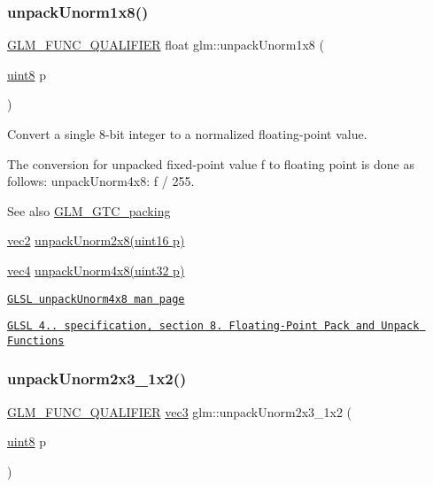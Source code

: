 \subsubsection{\texorpdfstring{unpack\+Unorm1x8()}{unpackUnorm1x8()}}
{\footnotesize\ttfamily \hyperlink{setup_8hpp_a33fdea6f91c5f834105f7415e2a64407}{G\+L\+M\+\_\+\+F\+U\+N\+C\+\_\+\+Q\+U\+A\+L\+I\+F\+I\+ER} float glm\+::unpack\+Unorm1x8 (\begin{DoxyParamCaption}\item[{\hyperlink{group__gtc__type__precision_ga1a7dcd8aac97cc8020817c94049deff2}{uint8}}]{p }\end{DoxyParamCaption})}

Convert a single 8-\/bit integer to a normalized floating-\/point value.

The conversion for unpacked fixed-\/point value f to floating point is done as follows\+: unpack\+Unorm4x8\+: f / 255.

\begin{DoxySeeAlso}{See also}
\hyperlink{group__gtc__packing}{G\+L\+M\+\_\+\+G\+T\+C\+\_\+packing} 

\hyperlink{group__core__types_gaa1618f51db67eaa145db101d8c8431d8}{vec2} \hyperlink{group__gtc__packing_ga96ce0c24339ee676e28a027fffd1edf6}{unpack\+Unorm2x8(uint16 p)} 

\hyperlink{group__core__types_ga5881b1b022d7fd1b7218f5916532dd02}{vec4} \hyperlink{group__core__func__packing_ga7f903259150b67e9466f5f8edffcd197}{unpack\+Unorm4x8(uint32 p)} 

\href{http://www.opengl.org/sdk/docs/manglsl/xhtml/unpackUnorm4x8.xml}{\tt G\+L\+SL unpack\+Unorm4x8 man page} 

\href{http://www.opengl.org/registry/doc/GLSLangSpec.4.20.8.pdf}{\tt G\+L\+SL 4.. specification, section 8. Floating-\/\+Point Pack and Unpack Functions} 
\end{DoxySeeAlso}
\mbox{\label{group__gtc__packing_gaeeacc5275329100c50fe8fc0871eb423}} 
\subsubsection{\texorpdfstring{unpack\+Unorm2x3\+\_\+1x2()}{unpackUnorm2x3\_1x2()}}
{\footnotesize\ttfamily \hyperlink{setup_8hpp_a33fdea6f91c5f834105f7415e2a64407}{G\+L\+M\+\_\+\+F\+U\+N\+C\+\_\+\+Q\+U\+A\+L\+I\+F\+I\+ER} \hyperlink{group__core__types_ga1c47e8b3386109bc992b6c48e91b0be7}{vec3} glm\+::unpack\+Unorm2x3\+\_\+1x2 (\begin{DoxyParamCaption}\item[{\hyperlink{group__gtc__type__precision_ga1a7dcd8aac97cc8020817c94049deff2}{uint8}}]{p }\end{DoxyParamCaption})}

